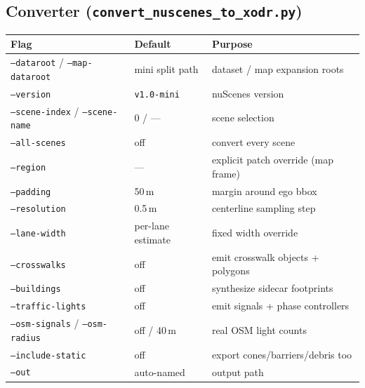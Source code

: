 \documentclass[11pt]{article}
\newcommand{\code}[1]{{\setlength{\fboxsep}{1.5pt}\colorbox{codegray}{\small\texttt{#1}}}}
\newcommand{\file}[1]{\texttt{#1}}
\begin{document}
\subsection{Converter (\file{convert\_nuscenes\_to\_xodr.py})}
\begin{center}
\footnotesize
\begin{tabular}{@{}lll@{}}
\toprule
\textbf{Flag} & \textbf{Default} & \textbf{Purpose} \\
\midrule
\code{--dataroot} / \code{--map-dataroot} & mini split path & dataset / map expansion roots \\
\code{--version}        & \code{v1.0-mini}  & nuScenes version \\
\code{--scene-index} / \code{--scene-name} & 0 / --- & scene selection \\
\code{--all-scenes}     & off               & convert every scene \\
\code{--region}         & ---               & explicit patch override (map frame) \\
\code{--padding}        & 50\,m             & margin around ego bbox \\
\code{--resolution}     & 0.5\,m            & centerline sampling step \\
\code{--lane-width}     & per-lane estimate & fixed width override \\
\code{--crosswalks}     & off               & emit crosswalk objects + polygons \\
\code{--buildings}      & off               & synthesize sidecar footprints \\
\code{--traffic-lights} & off               & emit signals + phase controllers \\
\code{--osm-signals} / \code{--osm-radius} & off / 40\,m & real OSM light counts \\
\code{--include-static} & off               & export cones/barriers/debris too \\
\code{--out}            & auto-named        & output path \\
\bottomrule
\end{tabular}
\end{center}
\end{document}
